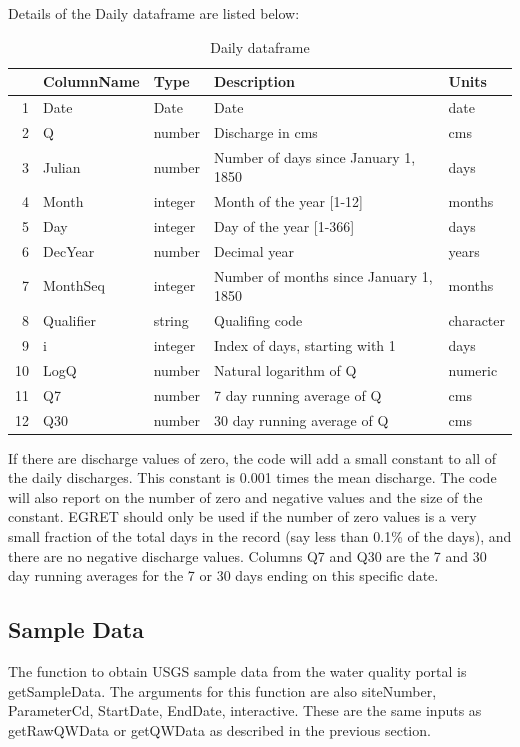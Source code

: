 \documentclass[a4paper,11pt]{article}\usepackage[]{graphicx}\usepackage[]{color}
\begin{document}
Details of the Daily dataframe are listed below:

\begin{table}[ht]
\centering
\begin{tabular}{rllll}
  \hline
 & ColumnName & Type & Description & Units \\ 
  \hline
1 & Date & Date & Date & date \\ 
  2 & Q & number & Discharge in cms & cms \\ 
  3 & Julian & number & Number of days since January 1, 1850 & days \\ 
  4 & Month & integer & Month of the year [1-12] & months \\ 
  5 & Day & integer & Day of the year [1-366] & days \\ 
  6 & DecYear & number & Decimal year & years \\ 
  7 & MonthSeq & integer & Number of months since January 1, 1850 & months \\ 
  8 & Qualifier & string & Qualifing code & character \\ 
  9 & i & integer & Index of days, starting with 1 & days \\ 
  10 & LogQ & number & Natural logarithm of Q & numeric \\ 
  11 & Q7 & number & 7 day running average of Q & cms \\ 
  12 & Q30 & number & 30 day running average of Q & cms \\ 
   \hline
\end{tabular}
\caption{Daily dataframe} 
\end{table}




If there are discharge values of zero, the code will add a small constant to all of the daily discharges.  This constant is 0.001 times the mean discharge.  The code will also report on the number of zero and negative values and the size of the constant.  EGRET should only be used if the number of zero values is a very small fraction of the total days in the record (say less than 0.1\% of the days), and there are no negative discharge values.  Columns Q7 and Q30 are the 7 and 30 day running averages for the 7 or 30 days ending on this specific date.

\FloatBarrier

\subsection{Sample Data}
\label{Samplesubsection}
The function to obtain USGS sample data from the water quality portal is getSampleData. The arguments for this function are also siteNumber, ParameterCd, StartDate, EndDate, interactive. These are the same inputs as getRawQWData or getQWData as described in the previous section.
\end{document}
